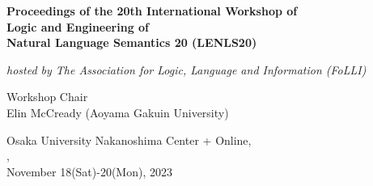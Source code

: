 \documentclass[12pt]{jarticle}
\begin{document}
\pagestyle{empty}

\vspace*{1cm}
\begin{Large}
\begin{center}
{\bf Proceedings of the 20th International Workshop of \\
     Logic and Engineering of \\Natural Language Semantics 20 (LENLS20)}
\end{center}
\end{Large}
\vspace*{1cm}
\begin{Large}
\begin{center}
{\em hosted by The Association for Logic, Language and Information (FoLLI)}
\end{center}
\end{Large}
\begin{large}
\vspace*{1cm}
\begin{center}
Workshop Chair\\ $\;$\\
Elin McCready (Aoyama Gakuin University)
\end{center}
\end{large}
\vspace*{3cm}
\vspace*{1cm}
\begin{large}
\begin{center}
Osaka University Nakanoshima Center + Online, \\
, \\
November 18(Sat)-20(Mon), 2023
\end{center}
\end{large}
\vfill

\newpage

\vspace*{20cm}
\vfill
\begin{large}

\end{large}

\newpage
\pagestyle{plain}
\end{document}
